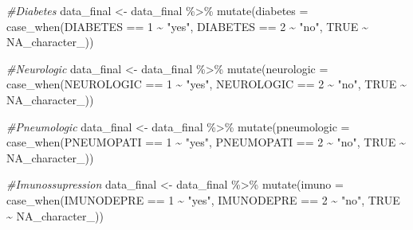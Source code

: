 \documentclass[
]{article}
\newenvironment{Shaded}{\begin{snugshade}}{\end{snugshade}}
\newcommand{\AttributeTok}[1]{\textcolor[rgb]{0.77,0.63,0.00}{#1}}
\newcommand{\CommentTok}[1]{\textcolor[rgb]{0.56,0.35,0.01}{\textit{#1}}}
\newcommand{\ConstantTok}[1]{\textcolor[rgb]{0.00,0.00,0.00}{#1}}
\newcommand{\DecValTok}[1]{\textcolor[rgb]{0.00,0.00,0.81}{#1}}
\newcommand{\FunctionTok}[1]{\textcolor[rgb]{0.00,0.00,0.00}{#1}}
\newcommand{\NormalTok}[1]{#1}
\newcommand{\OtherTok}[1]{\textcolor[rgb]{0.56,0.35,0.01}{#1}}
\newcommand{\SpecialCharTok}[1]{\textcolor[rgb]{0.00,0.00,0.00}{#1}}
\newcommand{\StringTok}[1]{\textcolor[rgb]{0.31,0.60,0.02}{#1}}
\begin{document}
\begin{Shaded}
\begin{Highlighting}[]
\CommentTok{\#Diabetes}
\NormalTok{data\_final }\OtherTok{\textless{}{-}}\NormalTok{  data\_final }\SpecialCharTok{\%\textgreater{}\%}
  \FunctionTok{mutate}\NormalTok{(}\AttributeTok{diabetes =} \FunctionTok{case\_when}\NormalTok{(DIABETES }\SpecialCharTok{==} \DecValTok{1} \SpecialCharTok{\textasciitilde{}} \StringTok{"yes"}\NormalTok{,}
\NormalTok{                              DIABETES }\SpecialCharTok{==} \DecValTok{2} \SpecialCharTok{\textasciitilde{}} \StringTok{"no"}\NormalTok{,}
                              \ConstantTok{TRUE} \SpecialCharTok{\textasciitilde{}} \ConstantTok{NA\_character\_}\NormalTok{))}

\CommentTok{\#Neurologic}
\NormalTok{data\_final }\OtherTok{\textless{}{-}}\NormalTok{  data\_final }\SpecialCharTok{\%\textgreater{}\%}
  \FunctionTok{mutate}\NormalTok{(}\AttributeTok{neurologic =} \FunctionTok{case\_when}\NormalTok{(NEUROLOGIC }\SpecialCharTok{==} \DecValTok{1} \SpecialCharTok{\textasciitilde{}} \StringTok{"yes"}\NormalTok{,}
\NormalTok{                                NEUROLOGIC }\SpecialCharTok{==} \DecValTok{2} \SpecialCharTok{\textasciitilde{}} \StringTok{"no"}\NormalTok{,}
                                \ConstantTok{TRUE} \SpecialCharTok{\textasciitilde{}} \ConstantTok{NA\_character\_}\NormalTok{))}

\CommentTok{\#Pneumologic}
\NormalTok{data\_final }\OtherTok{\textless{}{-}}\NormalTok{  data\_final }\SpecialCharTok{\%\textgreater{}\%}
  \FunctionTok{mutate}\NormalTok{(}\AttributeTok{pneumologic =} \FunctionTok{case\_when}\NormalTok{(PNEUMOPATI }\SpecialCharTok{==} \DecValTok{1} \SpecialCharTok{\textasciitilde{}} \StringTok{"yes"}\NormalTok{,}
\NormalTok{                                 PNEUMOPATI }\SpecialCharTok{==} \DecValTok{2} \SpecialCharTok{\textasciitilde{}} \StringTok{"no"}\NormalTok{,}
                                 \ConstantTok{TRUE} \SpecialCharTok{\textasciitilde{}} \ConstantTok{NA\_character\_}\NormalTok{))}

\CommentTok{\#Imunossupression}
\NormalTok{data\_final }\OtherTok{\textless{}{-}}\NormalTok{  data\_final }\SpecialCharTok{\%\textgreater{}\%}
  \FunctionTok{mutate}\NormalTok{(}\AttributeTok{imuno =} \FunctionTok{case\_when}\NormalTok{(IMUNODEPRE }\SpecialCharTok{==} \DecValTok{1} \SpecialCharTok{\textasciitilde{}} \StringTok{"yes"}\NormalTok{,}
\NormalTok{                           IMUNODEPRE }\SpecialCharTok{==} \DecValTok{2} \SpecialCharTok{\textasciitilde{}} \StringTok{"no"}\NormalTok{,}
                           \ConstantTok{TRUE} \SpecialCharTok{\textasciitilde{}} \ConstantTok{NA\_character\_}\NormalTok{))}


\end{Highlighting}
\end{Shaded}
\end{document}
